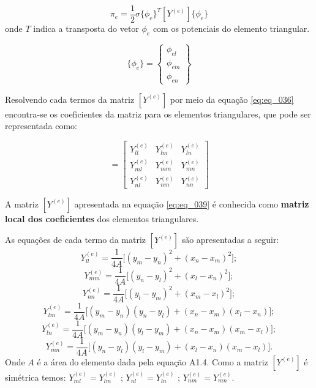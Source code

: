 \documentclass[
12pt,
a4paper,
oneside,
chapter=TITLE,
sumario=tradicional
]{abntex2}
\begin{document}
\begin{equation}
	\pi_e = \frac{1}{2} \sigma \{\phi_e\}^T [Y^{(e)}] \{\phi_e\}
	\label{eq:eq_037}
\end{equation}
onde $T$ indica a transposta do vetor ${\phi_e}$ com os potenciais  do elemento triangular.

\begin{equation*}
	\{\phi_e\} =
	\begin{Bmatrix}
		\phi_{e l} \\
		\phi_{e m} \\
		\phi_{e n}
	\end{Bmatrix} 
\end{equation*}


Resolvendo cada termos da matriz $[Y^{(e)}]$ por meio da equação \ref{eq:eq_036} encontra-se os  coeficientes da matriz para os elementos triangulares, que pode ser representada como:

\begin{equation}
	[Y^{(e)}] =
	\begin{bmatrix}
		Y^{(e)}_{ll} & Y^{(e)}_{lm} & Y^{(e)}_{ln} \\
		Y^{(e)}_{ml} & Y^{(e)}_{mm} & Y^{(e)}_{mn} \\
		Y^{(e)}_{nl} & Y^{(e)}_{nm} & Y^{(e)}_{nn}
	\end{bmatrix}
	\label{eq:eq_039}
\end{equation}


A matriz $[Y^{(e)}]$ apresentada na equação \ref{eq:eq_039} é conhecida como \textbf{matriz local dos coeficientes} dos elementos triangulares.


As equações de cada termo da matriz $[Y^{(e)}]$ são apresentadas a seguir:
$$
\boxed{Y_{ll}^{(e)} = \frac{1}{4A}\Big[(y_m - y_n)^2 + (x_n - x_m)^2\Big]; }
$$
$$
\boxed{Y_{mm}^{(e)} = \frac{1}{4A}\Big[(y_n - y_l)^2 + (x_l - x_n)^2\Big]; }
$$
$$
\boxed{Y_{nn}^{(e)} = \frac{1}{4A}\Big[(y_l - y_m)^2 + (x_m - x_l)^2\Big]; }
$$
$$
\boxed{Y_{lm}^{(e)} = \frac{1}{4A} \Big[ (y_m - y_n)(y_n - y_l) + (x_n - x_m)(x_l - x_n) \Big]; }
$$
$$
\boxed{Y_{ln}^{(e)} = \frac{1}{4A}\Big[(y_m - y_n)(y_l - y_m) + (x_n - x_m)(x_m - x_l)\Big]; }
$$
$$
\boxed{Y_{mn}^{(e)} = \frac{1}{4A}\Big[(y_n - y_l)(y_l - y_m) + (x_l - x_n)(x_m - x_l)\Big]. }
$$
Onde $A$ é a área do elemento dada pela equação A1.4.
Como a matriz $[Y^{(e)}]$ é simétrica temos:  $Y_{ml}^{(e)} = Y_{lm}^{(e)}$ ; $Y_{nl}^{(e)} = Y_{ln}^{(e)}$ ; $Y_{nm}^{(e)} = Y_{mn}^{(e)}$.
\end{document}
